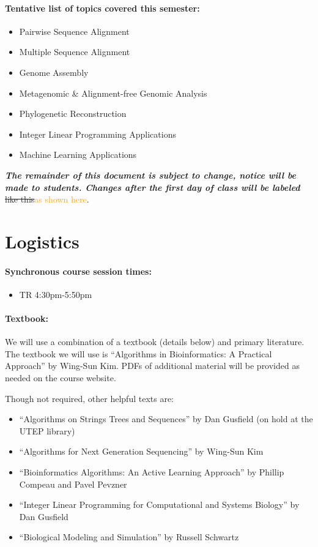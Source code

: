 \documentclass[12pt]{scrartcl}
\newcommand{\change}[2]{\sout{#1}\xspace\textcolor{orange}{#2}}
\begin{document}
\paragraph{Tentative list of topics covered this semester:}
\begin{itemize} 
\item Pairwise Sequence Alignment
\item Multiple Sequence Alignment
\item Genome Assembly
\item Metagenomic \& Alignment-free Genomic Analysis
\item Phylogenetic Reconstruction
\item Integer Linear Programming Applications
\item Machine Learning Applications
\end{itemize}

\textit{\textbf{The remainder of this document is subject to change, notice will be made to students. Changes after the first day of class will be labeled }}
\change{like this}{as  shown here}.

\tableofcontents

\clearpage
\section{Logistics}
\paragraph{Synchronous course session times:}
\begin{itemize}
\item TR 4:30pm-5:50pm
\end{itemize}


\paragraph{Textbook:} We will use a combination of a textbook (details below) and primary literature. 
The textbook we will use is ``Algorithms in Bioinformatics: A Practical Approach'' by Wing-Sun Kim. 
PDFs of additional material will be provided as needed on the course website. 

Though not required, other helpful texts are:
\begin{itemize}
\item ``Algorithms on Strings Trees and Sequences'' by Dan Gusfield (on hold at the UTEP library)
\item ``Algorithms for Next Generation Sequencing'' by Wing-Sun Kim
\item ``Bioinformatics Algorithms: An Active Learning Approach'' by Phillip Compeau and Pavel Pevzner 
\item ``Integer Linear Programming for Computational and Systems Biology'' by Dan Gusfield
\item ``Biological Modeling and Simulation'' by Russell Schwartz
\end{itemize}
\end{document}
